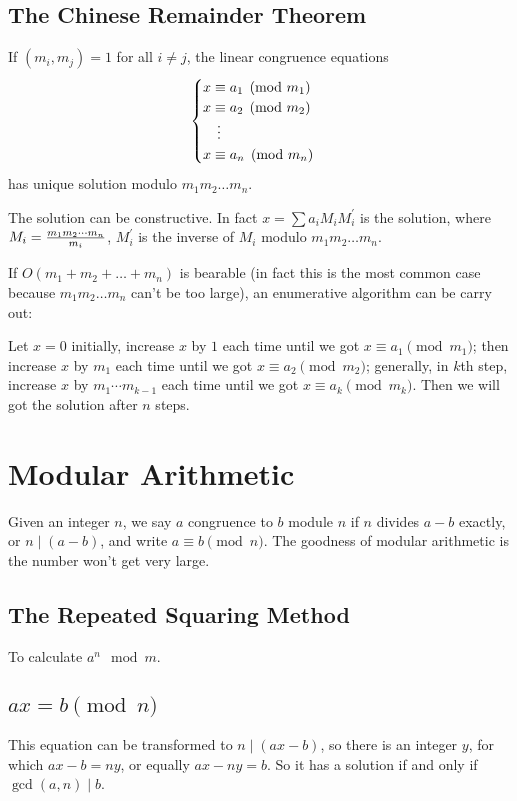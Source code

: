 \subsection{The Chinese Remainder Theorem}
\begin{thm}
If $(m_i,m_j)=1$ for all $i\neq j$, the linear congruence equations
$$\begin{cases}
x\equiv a_1\pmod{m_1}\cr
x\equiv a_2\pmod{m_2}\cr
\quad \vdots\cr
x\equiv a_n\pmod{m_n}\cr
\end{cases}$$
has unique solution modulo $m_1m_2\hdots m_n$.
\end{thm}
The solution can be constructive.
In fact $x=\sum a_iM_iM_i^\prime$ is the solution,
where $M_i={m_1m_2\cdots m_n\over m_i}$, $M_i^\prime$ is the inverse of $M_i$ modulo $m_1m_2\hdots m_n$.

If $O(m_1+m_2+\hdots+m_n)$ is bearable
(in fact this is the most common case because $m_1m_2\hdots m_n$ can't be too large),
an enumerative algorithm can be carry out:

Let $x=0$ initially, increase $x$ by $1$ each time until we got $x\equiv a_1\pmod{m_1}$;
then increase $x$ by $m_1$ each time until we got $x\equiv a_2\pmod{m_2}$;
generally, in $k$th step, increase $x$ by $m_1\cdots m_{k-1}$ each time until we got $x\equiv a_k\pmod{m_k}$.
Then we will got the solution after $n$ steps.

\section{Modular Arithmetic}
Given an integer $n$, we say $a$ congruence to $b$ module $n$ if $n$
divides $a - b$ exactly, or $n \mid (a - b)$, and write $a \equiv b \pmod n$.
The goodness of modular arithmetic is the number won't get very large.

\subsection{The Repeated Squaring Method}
To calculate $a^n \mod m$.


\subsection{$ax = b \pmod n$}
This equation can be transformed to $n \mid (ax - b)$,
so there is an integer $y$, for which $ax - b = ny$, or equally $ax - ny = b$.
So it has a solution if and only if $\gcd(a, n) \mid b$.

